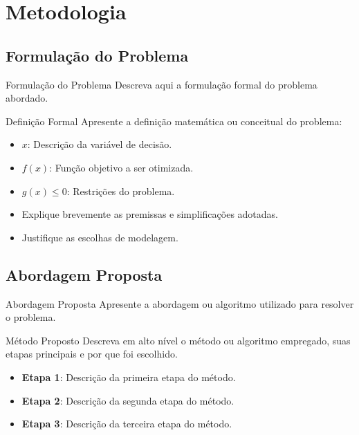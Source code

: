 \section{Metodologia}

\subsection{Formulação do Problema}
\begin{frame}{Formulação do Problema}
  Descreva aqui a formulação formal do problema abordado.
  
  \begin{block}{Definição Formal}
    Apresente a definição matemática ou conceitual do problema:
    \begin{itemize}
      \item $x$: Descrição da variável de decisão.
      \item $f(x)$: Função objetivo a ser otimizada.
      \item $g(x) \leq 0$: Restrições do problema.
    \end{itemize}
  \end{block}
  
  \begin{itemize}
    \item Explique brevemente as premissas e simplificações adotadas.
    \item Justifique as escolhas de modelagem.
  \end{itemize}
\end{frame}

\subsection{Abordagem Proposta}
\begin{frame}{Abordagem Proposta}
  Apresente a abordagem ou algoritmo utilizado para resolver o problema.

  \begin{exampleblock}{Método Proposto}
    Descreva em alto nível o método ou algoritmo empregado, suas etapas principais e por que foi escolhido.
  \end{exampleblock}
  
  \begin{itemize}
    \setlength{\itemsep}{10pt}
    \item \textbf{Etapa 1}: Descrição da primeira etapa do método.
    \item \textbf{Etapa 2}: Descrição da segunda etapa do método.
    \item \textbf{Etapa 3}: Descrição da terceira etapa do método.
  \end{itemize}
\end{frame}

